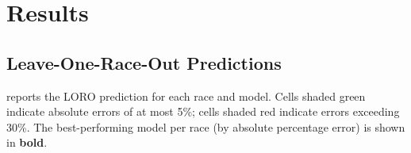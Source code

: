 \documentclass[11pt, a4paper]{article}
\begin{document}
\section{Results}
\label{sec:results}

\subsection{Leave-One-Race-Out Predictions}
\label{ssec:loro_results}

 reports the LORO prediction for each race and model.
Cells shaded \colorbox{goodgreen}{green} indicate absolute errors of at most
5\%; cells shaded \colorbox{badred}{red} indicate errors exceeding 30\%.
The best-performing model per race (by absolute percentage error) is
shown in \textbf{bold}.
\end{document}
